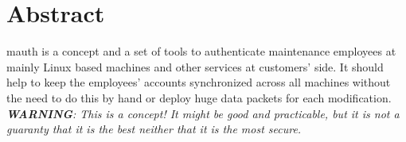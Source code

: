 %
%
%
%
%
%
%


\section*{Abstract}

mauth is a concept and a set of tools to authenticate maintenance employees at
mainly Linux based machines and other services at customers' side. It should
help to keep the employees' accounts synchronized across all machines without
the need to do this by hand or deploy huge data packets for each modification.
\\

\textit{\textbf{WARNING}: This is a concept! It might be good and practicable,
but it is not a guaranty that it is the best neither that it is the most
secure.}
